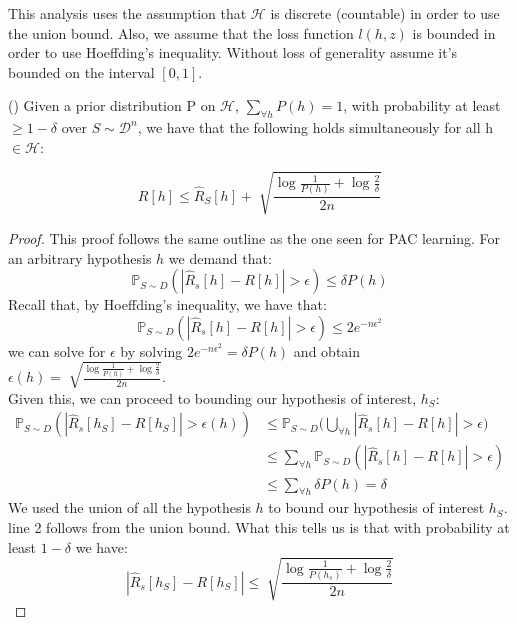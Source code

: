 \documentclass{article}
\begin{document}
This analysis uses the assumption that $\mathcal{H}$ is discrete (countable) in order to use the union bound. Also, we assume that the loss function $l(h,z)$ is bounded in order to use Hoeffding's inequality. Without loss of generality assume it's bounded on the interval $[0,1]$.





\begin{thm} (\citet{pac-bayes})
Given a prior distribution P on $\mathcal{H}$, \(\sum_{\forall h} P(h)=1\), with probability at least \(\geq 1-\delta\) over $S \sim \mathcal{D}^n$, we have that the following holds simultaneously for all h $\in \mathcal{H}$:

\[
 R[h]\leq \hat{R}_S[h]+\sqrt[]{\frac{\log\frac{1}{P(h)}+\log\frac{2}{\delta}}{2n}}
\]
\end{thm}

\begin{proof}
This proof follows the same outline as the one seen for PAC learning. For an arbitrary hypothesis $h$ we demand that: 
\[
\mathbb{P}_{S\sim D}(|\hat{R}_s[h]-R[h]| > \epsilon)\leq \delta P(h)
\]
Recall that, by Hoeffding's inequality, we have that: 
\[
\mathbb{P}_{S\sim D}(|\hat{R}_s[h]-R[h]| > \epsilon)\leq 2e^{ -n\epsilon^2}
\]
we can solve for $\epsilon$ by solving $2e^{ -n\epsilon^2} = \delta P(h) $ and obtain $\epsilon(h) = \sqrt[]{\frac{\log\frac{1}{P(h)}+\log\frac{2}{\delta}}{2n}}$.\\

Given this, we can proceed to bounding our hypothesis of interest, $h_S$:
\begin{align*}
\mathbb{P}_{S\sim D}(|\hat{R}_s[h_S]-R[h_S]| > \epsilon(h)) & \leq \mathbb{P}_{S\sim D}\big(\bigcup_{\forall h}|\hat{R}_s[h]-R[h]| > \epsilon \big) \\ 
& \leq \sum_{\forall h} \mathbb{P}_{S\sim D}(|\hat{R}_s[h]-R[h]| > \epsilon) \\
& \leq \sum_{\forall h} \delta P(h) = \delta
\end{align*}
We used the union of all the hypothesis $h$ to  bound our hypothesis of interest $h_S$. line 2 follows from the union bound. 
What this tells us is that with probability at least $1-\delta$ we have: $$|\hat{R}_s[h_S]-R[h_S]| \leq \sqrt[]{\frac{\log\frac{1}{P(h_s)}+\log\frac{2}{\delta}}{2n}}$$
\end{proof}
\end{document}
